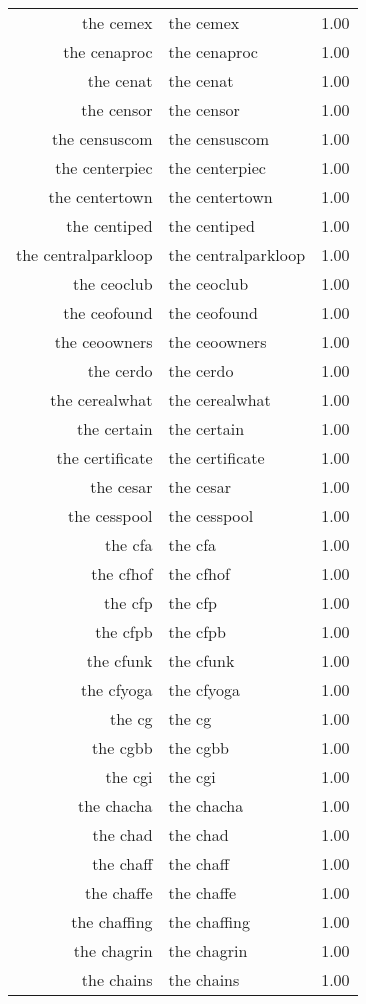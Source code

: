 \begin{table}[ht]
\begin{tabular}{rlr}
  the cemex & the cemex & 1.00 \\ 
  the cenaproc & the cenaproc & 1.00 \\ 
  the cenat & the cenat & 1.00 \\ 
  the censor & the censor & 1.00 \\ 
  the censuscom & the censuscom & 1.00 \\ 
  the centerpiec & the centerpiec & 1.00 \\ 
  the centertown & the centertown & 1.00 \\ 
  the centiped & the centiped & 1.00 \\ 
  the centralparkloop & the centralparkloop & 1.00 \\ 
  the ceoclub & the ceoclub & 1.00 \\ 
  the ceofound & the ceofound & 1.00 \\ 
  the ceoowners & the ceoowners & 1.00 \\ 
  the cerdo & the cerdo & 1.00 \\ 
  the cerealwhat & the cerealwhat & 1.00 \\ 
  the certain & the certain & 1.00 \\ 
  the certificate & the certificate & 1.00 \\ 
  the cesar & the cesar & 1.00 \\ 
  the cesspool & the cesspool & 1.00 \\ 
  the cfa & the cfa & 1.00 \\ 
  the cfhof & the cfhof & 1.00 \\ 
  the cfp & the cfp & 1.00 \\ 
  the cfpb & the cfpb & 1.00 \\ 
  the cfunk & the cfunk & 1.00 \\ 
  the cfyoga & the cfyoga & 1.00 \\ 
  the cg & the cg & 1.00 \\ 
  the cgbb & the cgbb & 1.00 \\ 
  the cgi & the cgi & 1.00 \\ 
  the chacha & the chacha & 1.00 \\ 
  the chad & the chad & 1.00 \\ 
  the chaff & the chaff & 1.00 \\ 
  the chaffe & the chaffe & 1.00 \\ 
  the chaffing & the chaffing & 1.00 \\ 
  the chagrin & the chagrin & 1.00 \\ 
  the chains & the chains & 1.00 \\ 

\end{tabular}
\end{table}
